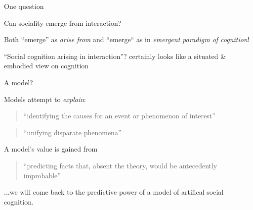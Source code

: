 \documentclass[compress]{beamer}
\begin{document}
\begin{frame}{One question}

    \Large
    \centering

    Can sociality emerge from interaction?

    \pause
    \normalsize
    \vspace{2em}

    Both ``emerge'' as \emph{arise from} and ``emerge`` as in \emph{emergent paradigm of
    cognition}!

    \pause

    ``Social cognition arising in interaction''? certainly looks like a situated \&
    embodied view on cognition

\end{frame}


{
\begin{frame}{A model?}

    Models attempt to \emph{explain}: 
    \begin{quote}
        ``identifying the causes for an event or phenomenon of interest''
    \end{quote}
    \begin{quote}
        ``unifying disparate phenomena''
    \end{quote}

        A model's value is gained from
    \begin{quote}
        ``predicting facts that, absent the theory, would be antecedently
        improbable''
    \end{quote}

    \pause

    ...we will come back to the predictive power of a model of artifical social
    cognition.

\end{frame}
}

\end{document}
